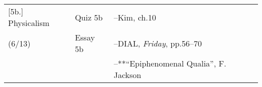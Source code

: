 \documentclass[article,oneside]{memoir}
\begin{document}
\begin{center}
\begin{longtable}{p{4.5cm}p{1.5cm}p{6.5cm}}
[5b.] Physicalism		& Quiz 5b		& --Kim, ch.10 \\ 
(6/13)				      	& Essay 5b		& --DIAL, \emph{Friday}, pp.56--70 \\ 
					      	&			& --**``Epiphenomenal Qualia'', F. Jackson \\ 
\end{longtable}
\end{center}
\end{document}
